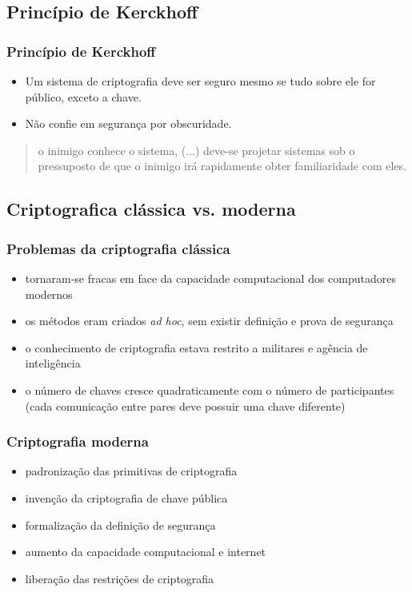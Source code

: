 \subsection{Princípio de Kerckhoff}
\begin{frame}
\frametitle{Princípio de Kerckhoff}
\begin{itemize}
\item Um sistema de criptografia deve ser seguro mesmo se tudo sobre ele for público, exceto a chave.
\item Não confie em segurança por obscuridade.
\end{itemize}

\vspace{2ex}
\begin{quote}
o inimigo conhece o sistema, (...) deve-se projetar sistemas sob o pressuposto de que o inimigo
irá rapidamente obter familiaridade com eles.
\end{quote}

\end{frame}


\subsection{Criptografica clássica vs. moderna}
\begin{frame}
\frametitle{Problemas da criptografia clássica}
\begin{itemize}
\item tornaram-se fracas em face da capacidade computacional dos computadores modernos
\item os métodos eram criados \emph{ad hoc}, sem existir definição e prova de segurança
\item o conhecimento de criptografia estava restrito a militares e agência de inteligência
\item o número de chaves cresce quadraticamente com o número de participantes (cada comunicação entre pares deve possuir uma chave diferente)
\end{itemize}
\end{frame}

\begin{frame}
\frametitle{Criptografia moderna}
\begin{itemize}
\item padronização das primitivas de criptografia
\item invenção da criptografia de chave pública
\item formalização da definição de segurança
\item aumento da capacidade computacional e internet
\item liberação das restrições de criptografia
\end{itemize}
\end{frame}


